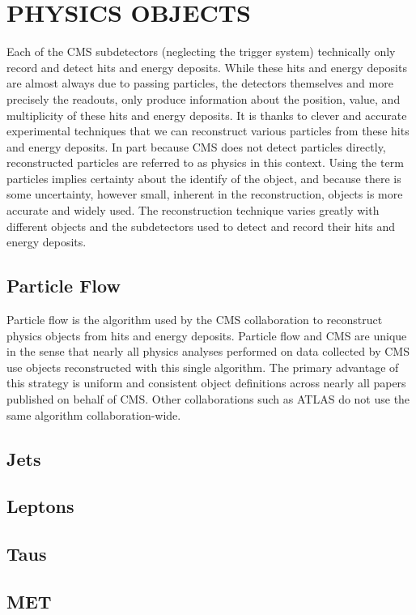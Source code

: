 %
%

\chapter{PHYSICS OBJECTS}
Each of the CMS subdetectors (neglecting the trigger system) technically only record and detect hits and energy deposits. While these hits and energy deposits are almost
always due to passing particles, the detectors themselves and more precisely the readouts, only produce information about the position, value, and multiplicity of
these hits and energy deposits. It is thanks to clever and accurate experimental techniques that we can reconstruct various particles from these hits and energy deposits.
In part because CMS does not detect particles directly, reconstructed particles are referred to as physics  in this context. Using
the term particles implies certainty about the identify of the object, and because there is some uncertainty, however small, inherent in the reconstruction, objects is
more accurate and widely used. The reconstruction technique varies greatly with different objects and the subdetectors used to detect and record their hits and energy
deposits. 

\section{Particle Flow}
Particle flow is the algorithm used by the CMS collaboration to reconstruct physics objects from hits and energy deposits. Particle flow and CMS are unique in the sense
that nearly all physics analyses performed on data collected by CMS use objects reconstructed with this single algorithm. The primary advantage of this strategy is
uniform and consistent object definitions across nearly all papers published on behalf of CMS. Other collaborations such as ATLAS do not use
the same algorithm collaboration-wide. 

\section{Jets}
\section{Leptons}
\section{Taus}
\section{MET}


